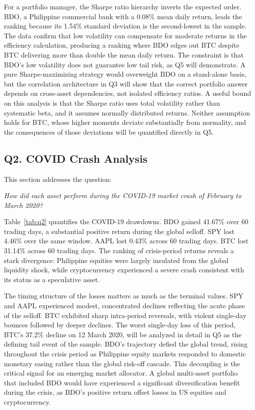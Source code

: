 For a portfolio manager, the Sharpe ratio hierarchy inverts the expected order. BDO, a Philippine commercial bank with a 0.08\% mean daily return, leads the ranking because its 1.54\% standard deviation is the second-lowest in the sample. The data confirm that low volatility can compensate for moderate returns in the efficiency calculation, producing a ranking where BDO edges out BTC despite BTC delivering more than double the mean daily return. The constraint is that BDO's low volatility does not guarantee low tail risk, as Q5 will demonstrate. A pure Sharpe-maximizing strategy would overweight BDO on a stand-alone basis, but the correlation architecture in Q3 will show that the correct portfolio answer depends on cross-asset dependencies, not isolated efficiency ratios. A useful bound on this analysis is that the Sharpe ratio uses total volatility rather than systematic beta, and it assumes normally distributed returns. Neither assumption holds for BTC, whose higher moments deviate substantially from normality, and the consequences of those deviations will be quantified directly in Q5.

\subsection{Q2. COVID Crash Analysis}

This section addresses the question:

\noindent\textit{How did each asset perform during the COVID-19 market crash of February to March 2020?}



Table~\ref{tab:q2} quantifies the COVID-19 drawdowns. BDO gained 41.67\% over 60 trading days, a substantial positive return during the global selloff. SPY lost 4.46\% over the same window. AAPL lost 0.43\% across 60 trading days. BTC lost 31.14\% across 60 trading days. The ranking of crisis-period returns reveals a stark divergence: Philippine equities were largely insulated from the global liquidity shock, while cryptocurrency experienced a severe crash consistent with its status as a speculative asset.

The timing structure of the losses matters as much as the terminal values. SPY and AAPL experienced modest, concentrated declines reflecting the acute phase of the selloff. BTC exhibited sharp intra-period reversals, with violent single-day bounces followed by deeper declines. The worst single-day loss of this period, BTC's 37.2\% decline on 12 March 2020, will be analyzed in detail in Q5 as the defining tail event of the sample. BDO's trajectory defied the global trend, rising throughout the crisis period as Philippine equity markets responded to domestic monetary easing rather than the global risk-off cascade. This decoupling is the critical signal for an emerging market allocator. A global multi-asset portfolio that included BDO would have experienced a significant diversification benefit during the crisis, as BDO's positive return offset losses in US equities and cryptocurrency.

